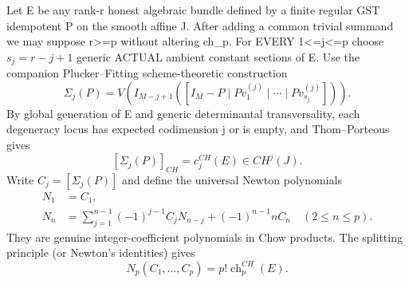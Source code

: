 \documentclass[11pt]{article}
\begin{document}
Let E be any rank-r honest algebraic
bundle defined by a finite regular
GST idempotent P on the smooth affine J.
After adding a common trivial summand
we may suppose r>=p without altering ch_p.
For EVERY 1<=j<=p choose
$s_j=r-j+1$ generic ACTUAL ambient
constant sections of E.
Use the companion Plucker--Fitting
scheme-theoretic construction
\[
 \Sigma_j(P)=
 V\left(I_{M-j+1}
 ([I_M-P\mid Pv_1^{(j)}\mid\cdots
                         \mid Pv_{s_j}^{(j)}])\right).
 \tag{8}
\]
By global generation of E and generic
determinantal transversality, each
degeneracy locus has expected codimension j
or is empty, and Thom--Porteous gives
\[
 \boxed{[\Sigma_j(P)]_{CH}=c_j^{CH}(E)
      \in CH^j(J).}                                   \tag{9}
\]
Write $C_j=[\Sigma_j(P)]$ and define
the universal Newton polynomials
\[
 \begin{aligned}
 N_1&=C_1,\\
 N_n&=\sum_{j=1}^{n-1}(-1)^{j-1}
                 C_jN_{n-j}
             +(-1)^{n-1}n C_n
                       \quad(2\le n\le p).
 \end{aligned}                                          \tag{10}
\]
They are genuine integer-coefficient
polynomials in Chow products.
The splitting principle (or Newton's
identities) gives
\[
 \boxed{N_p(C_1,\ldots,C_p)=
             p!\operatorname{ch}_p^{CH}(E).}          \tag{11}
\]
\end{document}

